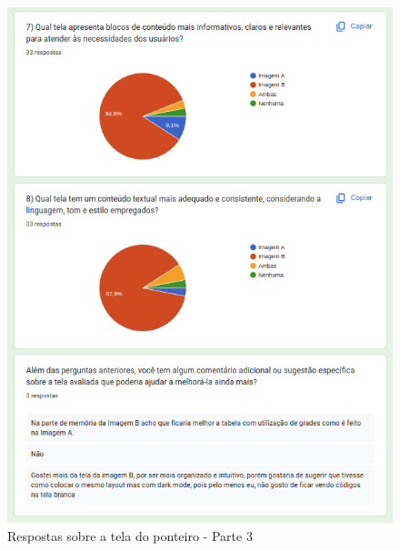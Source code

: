 \begin{figure}[!h]
	\begin{center}
	    \includegraphics[scale=0.7]{figs/Answers/Students/19.png}
	\end{center}
	\caption{\label{APB_TPon03}Respostas sobre a tela do ponteiro - Parte 3}
\end{figure}

\newpage